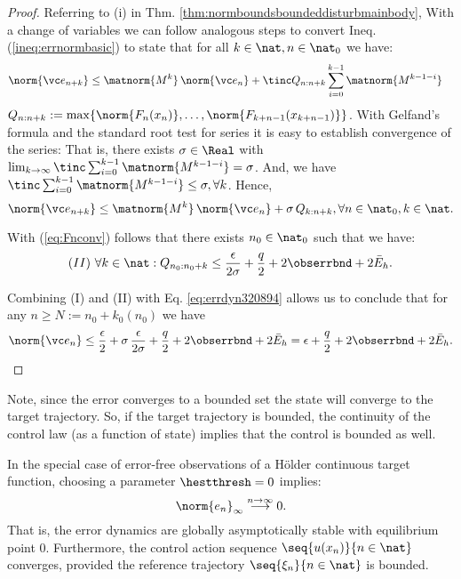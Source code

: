 \begin{proof}
Referring to (i) in Thm. \ref{thm:normboundsboundeddisturbmainbody}, With a change of variables we can follow analogous steps to convert Ineq. (\ref{ineq:errnormbasic}) to state that for all $k \in \nat, n \in \nat_0$ we have: 
\begin{align}
	\norm{\vc e_{n+k}} 	&\leq \matnorm{M^{k}} \, \norm{\vc e_n} + \tinc Q_{n:n+k}	 \sum_{i=0}^{k-1}  \matnorm{M^{k-1-i}} 	\label{ineq:errnormgeneral}
\end{align}
$Q_{n:n+k}:=\max\{\norm{F_n(x_n)},\ldots,\norm{F_{k+n-1}(x_{k+n-1})} \}$. 
With Gelfand's formula and the standard root test for series it is easy to establish convergence of the series: That is, there exists $\sigma \in \Real$ with $\lim_{k \to \infty} \tinc \sum_{i=0}^{k-1}  \matnorm{M^{k-1-i}} = \sigma$. And, we have $\tinc \sum_{i=0}^{k-1}  \matnorm{M^{k-1-i}} \leq \sigma, \forall k$.
Hence,
\begin{equation}
\norm{\vc e_{n+k}} \leq \matnorm{M^{k}} \, \norm{\vc e_n} + \sigma \, Q_{k:n+k}, \forall n \in \nat_0, k \in \nat.
\label{eq:errdyn320894}
\end{equation}


With (\ref{eq:Fnconv}) follows that there exists $n_0 \in \nat_0$ such that we have: $$ (II) \,\,  \forall k \in \nat : Q_{n_0:n_0+k}\leq  \frac{\epsilon}{2 \sigma} +\frac q 2 + 2  \obserrbnd  +2 \bar E_h.
 $$


%

Combining (I) and (II) with Eq. \ref{eq:errdyn320894} allows us to conclude that for any $n \geq N:= n_0 +k_0(n_0)$  we have 
\begin{equation*}
\norm{\vc e_{n}} \leq \frac \epsilon 2 + \sigma \,\frac{\epsilon}{2  \sigma} +\frac q 2 + 2  \obserrbnd  +2 \bar E_h= \epsilon +\frac q 2 + 2  \obserrbnd  +2 \bar E_h. 
\label{eq:errdyn3208942}
\end{equation*}
\end{proof}
Note, since the error converges to a bounded set the state will converge to the target trajectory. So, if the target trajectory is bounded, the continuity of the control law (as a function of state) implies that the control is bounded as well.

%
%
\begin{cor}
In the special case of error-free observations of a H\"older continuous target function, choosing a parameter $\hestthresh =0$ implies:
\[\norm{e_n}_\infty \stackrel{n \to \infty}{\longrightarrow} 0. \]
That is, the error dynamics are globally asymptotically stable with equilibrium point 0.
Furthermore, the control action sequence $\seq{u(x_n)}{n \in \nat}$ converges, provided the reference trajectory $\seq{\xi_n}{n \in \nat}$ is bounded.
\end{cor}

